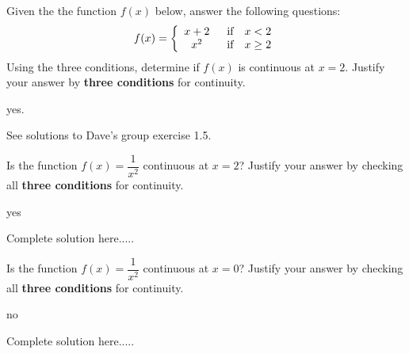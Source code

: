 \begin{example}
Given the the function $f(x)$ below, answer the following questions:
\begin{align*}
f(x) = \left\{ 
                \begin{array}{cc}
                     x+2 &           \hspace{2mm}     \textrm{if}      \quad x < 2 \\
                    x^2 &            \hspace{2mm}     \textrm{if}      \quad x \ge 2 \\
                \end{array}
            \right.
\end{align*}
Using the three conditions, determine if $f(x)$ is continuous at $x=2$. Justify your answer by \textbf{three conditions} for continuity.
    \begin{sol}
    yes.
    \end{sol}
    \begin{solL}
    See solutions to Dave's group exercise 1.5.
    
    \end{solL}
\end{example}


\begin{example}
Is the function $f(x)=\dfrac{1}{x^2}$ continuous at $x=2$? Justify your answer by checking all \textbf{three conditions} for continuity.
    \begin{sol}
    yes
    \end{sol}
    \begin{solL}
    Complete solution here.....
    
    \end{solL}
    
\end{example}

\begin{example}
Is the function $f(x)=\dfrac{1}{x^2}$ continuous at $x=0$? Justify your answer by checking all \textbf{three conditions} for continuity.
    \begin{sol}
    no
    \end{sol}
    \begin{solL}
    Complete solution here.....
    
    \end{solL}
    
\end{example}


